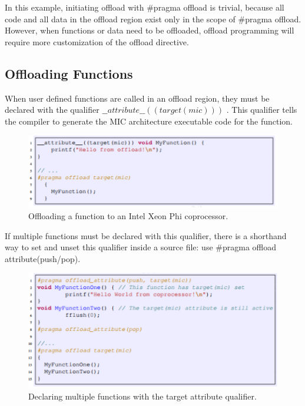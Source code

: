 \documentclass[12pt]{article}
\begin{document}
In this example, initiating offload with \#pragma offload is trivial, because all code and all data in the offload region exist only in the scope of \#pragma offload. However, when functions or data need to be offloaded, offload programming will require more customization of the offload directive.

\subsection{Offloading Functions}
When user defined functions are called in an offload region, they must be declared with the qualifier $\_\_attribute\_\_ ((target(mic)))$ . This qualifier tells the compiler to generate the MIC architecture executable code for the function.
\begin{figure}[H]
\centering
\includegraphics[scale = 0.9]{chainer9.png}
\caption{Offloading a function to an Intel Xeon Phi coprocessor.}
\end{figure}

If multiple functions must be declared with this qualifier, there is a shorthand way to set and unset this qualifier inside a source file: use \#pragma offload attribute(push/pop).
\begin{figure}[H]
\centering
\includegraphics[scale = 0.9]{chainer10.png}
\caption{Declaring multiple functions with the target attribute qualifier.}
\end{figure}
\end{document}
